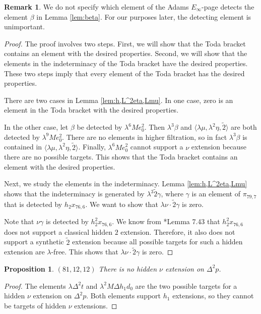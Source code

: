 \documentclass{amsart}
\newtheorem{prop}[thm]{Proposition}
\theoremstyle{definition}
\newtheorem{rmk}[thm]{Remark}
\newcommand{\hsf}{\widetilde{2}}
\newcommand{\lemdeg}[1]{$({#1})$}
\newcommand{\D}{\Delta}
\begin{document}
\begin{rmk}
We do not specify which element of the Adams $E_\infty$-page detects
the element $\beta$ in Lemma \ref{lem:beta}.  For our purposes later, 
the detecting element is unimportant.
\end{rmk}

\begin{proof}
The proof involves two steps.  First, we will show that the 
Toda bracket contains an element with the desired properties.
Second, we will show that the elements in the
indeterminacy of the Toda bracket have the desired properties.
These two steps imply that every element of the Toda bracket
has the desired properties.

There are two cases in Lemma \ref{lem:h,L^2eta,Lmu}.
In one case, zero is an element in the Toda bracket with the 
desired properties.

In the other case, let
$\beta$ be detected by $\lambda^6 M e_0^2$.
Then $\lambda^3 \beta$ and 
$\langle \lambda \mu, \lambda^2 \eta, \hsf \rangle$ are both
detected by $\lambda^9 M e_0^2$.
There are no elements in higher filtration, so in fact
$\lambda^3 \beta$ is contained in
$\langle \lambda \mu, \lambda^2 \eta, \hsf \rangle$.
Finally, $\lambda^6 M e_0^2$ cannot support a $\nu$ extension
because there are no possible targets.
This shows that the Toda bracket contains an element with the
desired properties.

Next, we study the elements in the indeterminacy.
Lemma \ref{lem:h,L^2eta,Lmu} shows that the indeterminacy 
is generated by $\lambda^3 \hsf \gamma$, where
$\gamma$ is an element of $\pi_{79,7}$ that is detected by
$h_2 x_{76,6}$.  We want to show that
$\lambda \nu \cdot \hsf \gamma$ is zero.

Note that $\nu \gamma$ is detected by $h_2^2 x_{76,6}$.
We know from \cite{IWX}*{Lemma 7.43} that $h_2^2 x_{76,6}$ does not support a classical
hidden $2$ extension.  Therefore, it also does not support a 
synthetic $\hsf$ extension because all possible targets for such a
hidden extension are $\lambda$-free.
This shows that $\lambda \nu \cdot \hsf \gamma$ is zero.
\end{proof}

\begin{prop}
\label{prop:nu-D^2p}
\lemdeg{81, 12, 12}
There is no hidden $\nu$ extension on $\D^2 p$.
\end{prop}

\begin{proof}
The elements $\lambda \D^2 t$ and $\lambda^2 M \D h_1 d_0$
are the two possible targets for a hidden $\nu$ extension
on $\D^2 p$.  Both elements support $h_1$ extensions,
so they cannot be targets of hidden $\nu$ extensions.
\end{proof}
\end{document}
